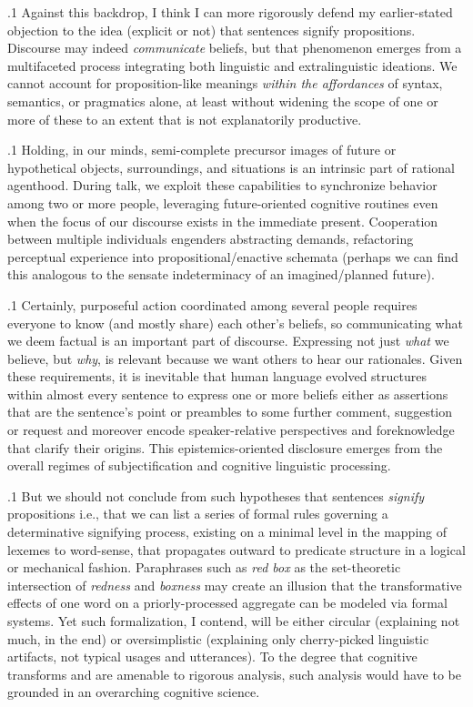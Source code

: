 \documentclass[11pt, twocolumn]{article}
\begin{document}
{{\p.1{%
Against this backdrop, I think I can more rigorously
defend my earlier-stated objection to the
idea (explicit or not) that sentences signify propositions.
Discourse may indeed \textit{communicate} beliefs,
but that phenomenon emerges from a multifaceted
process integrating both linguistic and extralinguistic
ideations. We cannot account for proposition-like
meanings \textit{within the affordances} of syntax, semantics,
or pragmatics alone, at least without widening the scope
of one or more of these to an extent that is not explanatorily
productive.
}%

\p.1{%
Holding, in our minds, semi-complete precursor images of
future or hypothetical objects, surroundings, and
situations is an intrinsic part of rational agenthood.
During talk, we exploit these capabilities
to synchronize behavior among two or more people,
leveraging future-oriented cognitive routines even
when the focus of our discourse exists in the immediate
present. Cooperation between multiple individuals engenders
abstracting demands, refactoring perceptual experience
into propositional/enactive schemata (perhaps we can find this
analogous to the sensate indeterminacy
of an imagined/planned future).
}%

\p.1{%
Certainly, purposeful action coordinated among several people requires
everyone to know (and mostly share) each other's beliefs,
so communicating what we deem factual is an important part of
discourse. Expressing not just \textit{what} we believe, but \textit{why},
is relevant because we want others to hear our rationales.
Given these requirements, it is inevitable that human
language evolved structures within almost every sentence
to express one or more beliefs \mdash{} either as assertions that
are the sentence's point or preambles to some further
comment, suggestion or request \mdash{} and moreover
encode speaker-relative perspectives and foreknowledge that
clarify their origins. This
epistemics-oriented \pgl{}disclosure
emerges from the overall regimes of subjectification and
cognitive linguistic processing.
}%

\p.1{%
But we should not conclude from such hypotheses that
sentences \textit{signify} propositions \mdash{} i.e., that
we can list a series of formal rules governing a determinative signifying process,
existing on a minimal level in the mapping of lexemes
to word-sense, that propagates outward to predicate
structure in a logical or mechanical fashion.
Paraphrases such as \textit{red box} as the set-theoretic
intersection of \textit{redness} and \textit{boxness} may
create an illusion that the transformative
effects of one word on a priorly-processed aggregate
can be modeled via formal systems. Yet such
formalization, I contend, will be either circular
(explaining not much, in the end) or oversimplistic
(explaining only cherry-picked linguistic artifacts,
not typical usages and utterances). To the degree
that cognitive transforms and  are
amenable to rigorous analysis, such analysis
would have to be grounded in an overarching
cognitive science.
}%

}}
\end{document}
